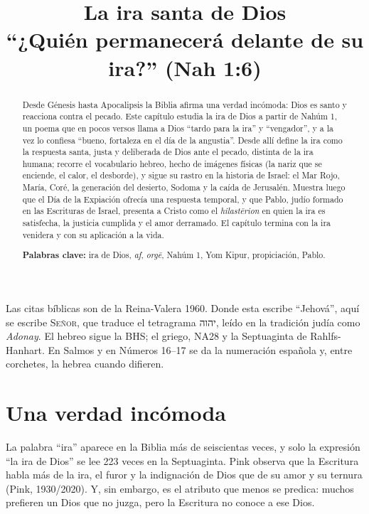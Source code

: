 \documentclass[11pt,letterpaper]{article}
\title{\color{azul}\bfseries La ira santa de Dios\\[4pt]\large\color{gris}\mdseries ``¿Quién permanecerá delante de su ira?'' (Nah 1:6)}
\author{}\date{}
\newcommand{\heb}[1]{\mbox{\foreignlanguage{hebrew}{#1}}}
\newcommand{\SENOR}{\textsc{Señor}}
\begin{document}
\maketitle\thispagestyle{empty}

\begin{abstract}\noindent
Desde Génesis hasta Apocalipsis la Biblia afirma una verdad incómoda: Dios es santo y reacciona contra el pecado. Este capítulo estudia la ira de Dios a partir de Nahúm 1, un poema que en pocos versos llama a Dios ``tardo para la ira'' y ``vengador'', y a la vez lo confiesa ``bueno, fortaleza en el día de la angustia''. Desde allí define la ira como la respuesta santa, justa y deliberada de Dios ante el pecado, distinta de la ira humana; recorre el vocabulario hebreo, hecho de imágenes físicas (la nariz que se enciende, el calor, el desborde), y sigue su rastro en la historia de Israel: el Mar Rojo, María, Coré, la generación del desierto, Sodoma y la caída de Jerusalén. Muestra luego que el Día de la Expiación ofrecía una respuesta temporal, y que Pablo, judío formado en las Escrituras de Israel, presenta a Cristo como el \emph{hilastērion} en quien la ira es satisfecha, la justicia cumplida y el amor derramado. El capítulo termina con la ira venidera y con su aplicación a la vida.
\par\smallskip\noindent\textbf{Palabras clave:} ira de Dios, \emph{af}, \emph{orgē}, Nahúm 1, Yom Kipur, propiciación, Pablo.\end{abstract}

\begin{nota}
Las citas bíblicas son de la Reina-Valera 1960. Donde esta escribe ``Jehová'', aquí se escribe \SENOR, que traduce el tetragrama \heb{יהוה}, leído en la tradición judía como \emph{Adonay}. El hebreo sigue la BHS; el griego, NA28 y la Septuaginta de Rahlfs-Hanhart. En Salmos y en Números 16--17 se da la numeración española y, entre corchetes, la hebrea cuando difieren.
\end{nota}

\section{Una verdad incómoda}

La palabra ``ira'' aparece en la Biblia más de seiscientas veces, y solo la expresión ``la ira de Dios'' se lee 223 veces en la Septuaginta. Pink observa que la Escritura habla más de la ira, el furor y la indignación de Dios que de su amor y su ternura (Pink, 1930/2020). Y, sin embargo, es el atributo que menos se predica: muchos prefieren un Dios que no juzga, pero la Escritura no conoce a ese Dios.
\end{document}
